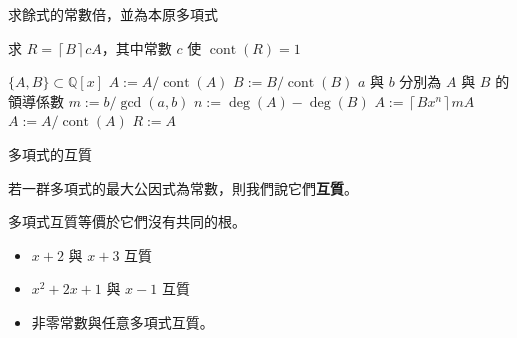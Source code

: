 \documentclass{beamer}
\newcommand{\Left} {\mathopen{}\mathclose\bgroup\left}
\newcommand{\Right}{\aftergroup\egroup\right}
\newcommand{\Z}{\mathbb Z}
\newcommand{\Q}{\mathbb Q}
\newcommand{\cont}{\operatorname{cont}}
\newcommand{\negskip}{\vskip -2em plus 3pt minus 3pt}
\theoremstyle{remark}
\begin{document}
\begin{CJK}{UTF8}{bsmi}
\begin{frame}{求餘式的常數倍，並為本原多項式}
  \begin{algorithm}[H]
    \caption{求 $R = \left\lceil B \right\rceil cA$，其中常數 $c$ 使 $\cont(R) = 1$}
    \begin{algorithmic}[1]
      \REQUIRE $\{A,B\} \subset \Q[x]$
      \STATE $A := A/\cont(A)$
      \STATE $B := B/\cont(B)$ 
	\STATE $a$ 與 $b$ 分別為 $A$ 與 $B$ 的領導係數
	\STATE $m := b/\gcd(a,b)$
	\STATE $n := \deg(A) - \deg(B)$
	\STATE $A := \left\lceil Bx^n \right\rceil mA$ \COMMENT{$A$ 至少降一次且仍為 $\Z[x]$}
	\STATE $A := A/\cont(A)$
      \ENDWHILE
      \RETURN $R := A$
    \end{algorithmic}
  \end{algorithm}
\end{frame}


\begin{frame}{多項式的互質}
  \begin{definition}
    若一群多項式的最大公因式為常數，則我們說它們\textbf{互質}。
  \end{definition}
  \begin{theorem}
    多項式互質等價於它們沒有共同的根。
  \end{theorem}
  \begin{example}
    \begin{itemize}
      \item $x+2$ 與 $x+3$ 互質
      \item $x^2 + 2x + 1$ 與 $x-1$ 互質
      \item 非零常數與任意多項式互質。
    \end{itemize}
  \end{example}
\end{frame}


\end{CJK}
\end{document}

